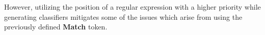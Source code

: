 However, utilizing the position of a regular expression with a higher priority while generating classifiers mitigates some of the issues which arise from using the previously defined {\bf Match} token.




%

%
%
%
%
